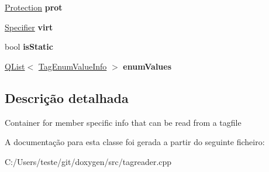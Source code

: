\begin{DoxyCompactItemize}
\item 
\hypertarget{class_tag_member_info_a3f887065f93ce5f02dea21da35468e8e}{\hyperlink{types_8h_a90e352184df58cd09455fe9996cd4ded}{Protection} {\bfseries prot}}\label{class_tag_member_info_a3f887065f93ce5f02dea21da35468e8e}

\item 
\hypertarget{class_tag_member_info_aa05b4729c780621416429c6aac10fccf}{\hyperlink{types_8h_ab16236bdd10ddf4d73a9847350f0017e}{Specifier} {\bfseries virt}}\label{class_tag_member_info_aa05b4729c780621416429c6aac10fccf}

\item 
\hypertarget{class_tag_member_info_a3e1d0cb67aacaa6d9c38b825147bfe5a}{bool {\bfseries is\-Static}}\label{class_tag_member_info_a3e1d0cb67aacaa6d9c38b825147bfe5a}

\item 
\hypertarget{class_tag_member_info_aba5b42c5d5aaa3840fca2554f607be2c}{\hyperlink{class_q_list}{Q\-List}$<$ \hyperlink{class_tag_enum_value_info}{Tag\-Enum\-Value\-Info} $>$ {\bfseries enum\-Values}}\label{class_tag_member_info_aba5b42c5d5aaa3840fca2554f607be2c}

\end{DoxyCompactItemize}


\subsection{Descrição detalhada}
Container for member specific info that can be read from a tagfile 

A documentação para esta classe foi gerada a partir do seguinte ficheiro\-:\begin{DoxyCompactItemize}
\item 
C\-:/\-Users/teste/git/doxygen/src/tagreader.\-cpp\end{DoxyCompactItemize}
